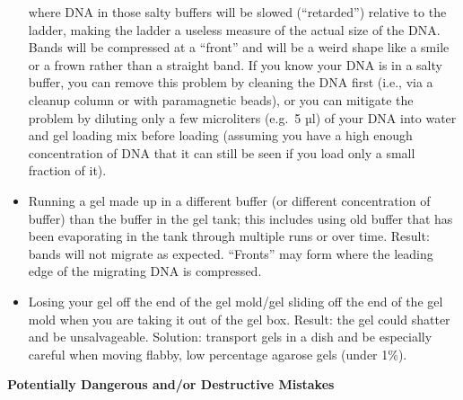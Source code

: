 \documentclass[
  letterpaper,
  DIV=11,
  numbers=noendperiod]{scrreprt}
\begin{document}
\begin{itemize}
  where DNA in those salty buffers will be slowed (``retarded'')
  relative to the ladder, making the ladder a useless measure of the
  actual size of the DNA. Bands will be compressed at a ``front'' and
  will be a weird shape like a smile or a frown rather than a straight
  band. If you know your DNA is in a salty buffer, you can remove this
  problem by cleaning the DNA first (i.e., via a cleanup column or with
  paramagnetic beads), or you can mitigate the problem by diluting only
  a few microliters (e.g.~5 µl) of your DNA into water and gel loading
  mix before loading (assuming you have a high enough concentration of
  DNA that it can still be seen if you load only a small fraction of
  it).
\item
  Running a gel made up in a different buffer (or different
  concentration of buffer) than the buffer in the gel tank; this
  includes using old buffer that has been evaporating in the tank
  through multiple runs or over time. Result: bands will not migrate as
  expected. ``Fronts'' may form where the leading edge of the migrating
  DNA is compressed.
\item
  Losing your gel off the end of the gel mold/gel sliding off the end of
  the gel mold when you are taking it out of the gel box. Result: the
  gel could shatter and be unsalvageable. Solution: transport gels in a
  dish and be especially careful when moving flabby, low percentage
  agarose gels (under 1\%).
\end{itemize}

\textbf{Potentially Dangerous and/or Destructive Mistakes}
\end{document}
